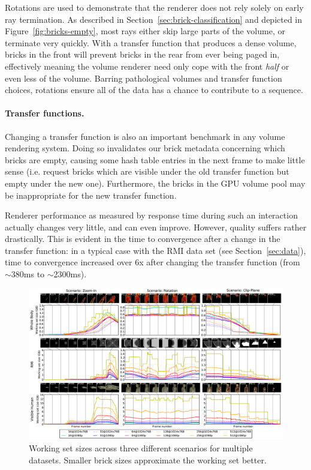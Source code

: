 Rotations are used to demonstrate that the renderer does not rely
solely on early ray termination.  As described in
Section~\ref{sec:brick-classification} and depicted in
Figure~\ref{fig:bricks-empty}, most rays either skip large parts of
the volume, or terminate very quickly.  With a transfer function that
produces a dense volume, bricks in the front will prevent bricks in the
rear from ever being paged in, effectively meaning the volume renderer
need only cope with the front \emph{half} or even less of the volume.
Barring pathological volumes and transfer function choices, rotations
ensure all of the data has a chance to contribute to a sequence.

\paragraph{Transfer functions.} Changing a transfer function is also
an important benchmark in any volume rendering system.  Doing so
invalidates our brick metadata concerning which bricks are empty,
causing some hash table entries in the next frame to make little sense
(i.e. request bricks which are visible under the old transfer function
but empty under the new one).  Furthermore, the bricks in the GPU
volume pool may be inappropriate for the new transfer function.

Renderer performance as measured by response time during such an
interaction actually changes very little, and can even improve.
However, quality suffers rather drastically.  This is evident in the
time to convergence after a change in the transfer function: in a
typical case with the RMI data set (see Section~\ref{sec:data}), time
to convergence increased over 6x after changing the transfer function
(from $\sim$380ms to $\sim$2300ms).

\begin{figure}
  \centering
  \includegraphics[width=0.98\linewidth]{images/rg/workingSets1-150dpi.pdf}
  \caption{Working set sizes across three different scenarios for
  multiple datasets.  Smaller brick sizes approximate the working set
  better.}
  \label{fig:working-set}
\end{figure}

